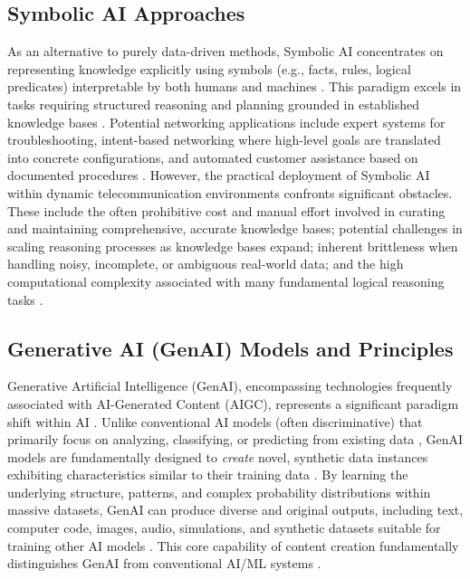 \documentclass[sigconf]{acmart}
\begin{document}
\subsection{Symbolic AI Approaches}

As an alternative to purely data-driven methods, Symbolic AI concentrates on representing knowledge explicitly using symbols (e.g., facts, rules, logical predicates) interpretable by both humans and machines \cite{ref6}. This paradigm excels in tasks requiring structured reasoning and planning grounded in established knowledge bases \cite{ref6}. Potential networking applications include expert systems for troubleshooting, intent-based networking where high-level goals are translated into concrete configurations, and automated customer assistance based on documented procedures \cite{ref6}. However, the practical deployment of Symbolic AI within dynamic telecommunication environments confronts significant obstacles. These include the often prohibitive cost and manual effort involved in curating and maintaining comprehensive, accurate knowledge bases; potential challenges in scaling reasoning processes as knowledge bases expand; inherent brittleness when handling noisy, incomplete, or ambiguous real-world data; and the high computational complexity associated with many fundamental logical reasoning tasks \cite{ref6}.

\subsection{Generative AI (GenAI) Models and Principles}

Generative Artificial Intelligence (GenAI), encompassing technologies frequently associated with AI-Generated Content (AIGC), represents a significant paradigm shift within AI \cite{ref26, ref31}. Unlike conventional AI models (often discriminative) that primarily focus on analyzing, classifying, or predicting from existing data \cite{ref19, ref26}, GenAI models are fundamentally designed to \textit{create} novel, synthetic data instances exhibiting characteristics similar to their training data \cite{ref5, ref19, ref26}. By learning the underlying structure, patterns, and complex probability distributions within massive datasets, GenAI can produce diverse and original outputs, including text, computer code, images, audio, simulations, and synthetic datasets suitable for training other AI models \cite{ref5, ref9, ref22, ref23, ref24, ref26, ref31}. This core capability of content creation fundamentally distinguishes GenAI from conventional AI/ML systems \cite{ref19, ref26}.
\end{document}
